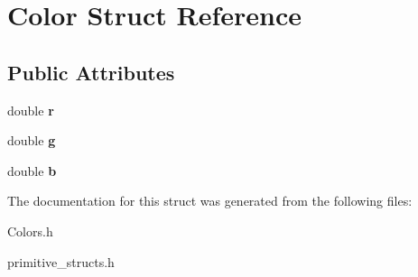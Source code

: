 \hypertarget{struct_color}{}\section{Color Struct Reference}
\label{struct_color}
\subsection*{Public Attributes}
\begin{DoxyCompactItemize}
\item 
double {\bfseries r}\hypertarget{struct_color_a12b28b8a60c6add344b485d12e1d2168}{}\label{struct_color_a12b28b8a60c6add344b485d12e1d2168}

\item 
double {\bfseries g}\hypertarget{struct_color_adcc846eae0491cee6a64f503044bca1b}{}\label{struct_color_adcc846eae0491cee6a64f503044bca1b}

\item 
double {\bfseries b}\hypertarget{struct_color_a37683f9d882695ac49f945d52158055a}{}\label{struct_color_a37683f9d882695ac49f945d52158055a}

\end{DoxyCompactItemize}


The documentation for this struct was generated from the following files\+:\begin{DoxyCompactItemize}
\item 
Colors.\+h\item 
primitive\+\_\+structs.\+h\end{DoxyCompactItemize}
